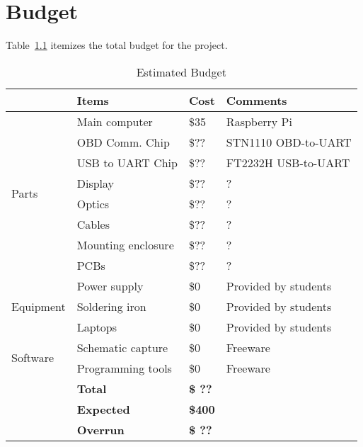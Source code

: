 \chapter{Budget}



Table~\ref{tab:budget} itemizes the total budget for the project.

\begin{table}
\centering
\begin{tabular}{|l|l|l|l|}
\hline
 & Items & Cost & Comments \\ \hline
\multirow{8}{*}{Parts}
 & Main computer            & \$35  & Raspberry Pi \cite{raspifaq}         \\
 & OBD Comm. Chip           & \$??  & STN1110 OBD-to-UART \cite{stn1110ds} \\
 & USB to UART Chip         & \$??  & FT2232H USB-to-UART \cite{ft2232hds} \\
 & Display                  & \$??  & ? \\
 & Optics                   & \$??  & ? \\
 & Cables                   & \$??  & ? \\
 & Mounting enclosure       & \$??  & ? \\
 & PCBs                     & \$??  & ? \\ \hline
\multirow{3}{*}{Equipment}
 & Power supply             & \$0   & Provided by students \\
 & Soldering iron           & \$0   & Provided by students \\
 & Laptops                  & \$0   & Provided by students \\ \hline
\multirow{2}{*}{Software}
 & Schematic capture        & \$0   & Freeware \\
 & Programming tools        & \$0   & Freeware \\ \hline

& \textbf{Total}    & \textbf{\$ ?? } & \\ \hline
& \textbf{Expected} & \textbf{\$400 } & \\ \hline
& \textbf{Overrun} &  \textbf{\$ ?? } & \\ \hline
\end{tabular}
\caption{Estimated Budget}
\label{tab:budget}
\end{table}
